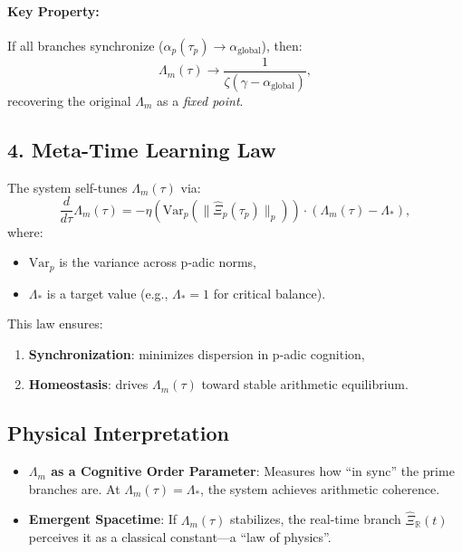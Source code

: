 \documentclass[12pt]{article}
\theoremstyle{plain}
\begin{document}
\paragraph*{Key Property:} If all branches synchronize (\( \alpha_p(\tau_p) \to \alpha_{\text{global}} \)), then:
\[
\Lambda_m(\tau) \to \frac{1}{\zeta(\gamma - \alpha_{\text{global}})},
\]
recovering the original \( \Lambda_m \) as a \emph{fixed point}.

\subsection*{4. Meta-Time Learning Law}

The system self-tunes \( \Lambda_m(\tau) \) via:
\[
\frac{d}{d\tau} \Lambda_m(\tau) = -\eta \left( \text{Var}_p \left( \| \hat{\Xi}_p(\tau_p) \|_p \right) \right) \cdot \left( \Lambda_m(\tau) - \Lambda_* \right),
\]
where:
\begin{itemize}
    \item \( \text{Var}_p \) is the variance across p-adic norms,
    \item \( \Lambda_* \) is a target value (e.g., \( \Lambda_* = 1 \) for critical balance).
\end{itemize}

This law ensures:
\begin{enumerate}
    \item \textbf{Synchronization}: minimizes dispersion in p-adic cognition,
    \item \textbf{Homeostasis}: drives \( \Lambda_m(\tau) \) toward stable arithmetic equilibrium.
\end{enumerate}

\subsection*{Physical Interpretation}

\begin{itemize}
    \item \textbf{\(\Lambda_m\) as a Cognitive Order Parameter}:  
    Measures how ``in sync'' the prime branches are. At \( \Lambda_m(\tau) = \Lambda_* \), the system achieves arithmetic coherence.
    
    \item \textbf{Emergent Spacetime}:  
    If \( \Lambda_m(\tau) \) stabilizes, the real-time branch \( \hat{\Xi}_\mathbb{R}(t) \) perceives it as a classical constant—a ``law of physics''.
\end{itemize}
\end{document}
